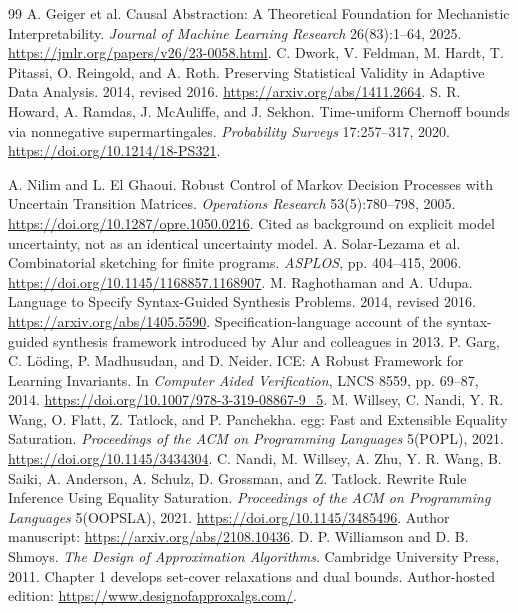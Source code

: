 \documentclass[11pt,letterpaper]{article}
\theoremstyle{plain}
\theoremstyle{definition}
\begin{document}
\begin{thebibliography}{99}
 A. Geiger et al. Causal Abstraction: A Theoretical Foundation for Mechanistic Interpretability. \emph{Journal of Machine Learning Research} 26(83):1--64, 2025. \url{https://jmlr.org/papers/v26/23-0058.html}.
 C. Dwork, V. Feldman, M. Hardt, T. Pitassi, O. Reingold, and A. Roth. Preserving Statistical Validity in Adaptive Data Analysis. 2014, revised 2016. \url{https://arxiv.org/abs/1411.2664}.
 S. R. Howard, A. Ramdas, J. McAuliffe, and J. Sekhon. Time-uniform Chernoff bounds via nonnegative supermartingales. \emph{Probability Surveys} 17:257--317, 2020. \url{https://doi.org/10.1214/18-PS321}.

 A. Nilim and L. El Ghaoui. Robust Control of Markov Decision Processes with Uncertain Transition Matrices. \emph{Operations Research} 53(5):780--798, 2005. \url{https://doi.org/10.1287/opre.1050.0216}. Cited as background on explicit model uncertainty, not as an identical uncertainty model.
 A. Solar-Lezama et al. Combinatorial sketching for finite programs. \emph{ASPLOS}, pp. 404--415, 2006. \url{https://doi.org/10.1145/1168857.1168907}.
 M. Raghothaman and A. Udupa. Language to Specify Syntax-Guided Synthesis Problems. 2014, revised 2016. \url{https://arxiv.org/abs/1405.5590}. Specification-language account of the syntax-guided synthesis framework introduced by Alur and colleagues in 2013.
 P. Garg, C. L\"oding, P. Madhusudan, and D. Neider. ICE: A Robust Framework for Learning Invariants. In \emph{Computer Aided Verification}, LNCS 8559, pp. 69--87, 2014. \url{https://doi.org/10.1007/978-3-319-08867-9_5}.
 M. Willsey, C. Nandi, Y. R. Wang, O. Flatt, Z. Tatlock, and P. Panchekha. egg: Fast and Extensible Equality Saturation. \emph{Proceedings of the ACM on Programming Languages} 5(POPL), 2021. \url{https://doi.org/10.1145/3434304}.
 C. Nandi, M. Willsey, A. Zhu, Y. R. Wang, B. Saiki, A. Anderson, A. Schulz, D. Grossman, and Z. Tatlock. Rewrite Rule Inference Using Equality Saturation. \emph{Proceedings of the ACM on Programming Languages} 5(OOPSLA), 2021. \url{https://doi.org/10.1145/3485496}. Author manuscript: \url{https://arxiv.org/abs/2108.10436}.
 D. P. Williamson and D. B. Shmoys. \emph{The Design of Approximation Algorithms}. Cambridge University Press, 2011. Chapter 1 develops set-cover relaxations and dual bounds. Author-hosted edition: \url{https://www.designofapproxalgs.com/}.
\end{thebibliography}
\end{document}
